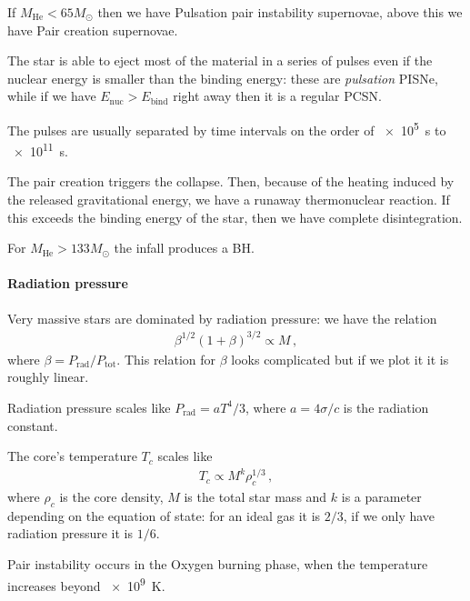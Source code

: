 \documentclass[main.tex]{subfiles}
\begin{document}
If \(M _{\text{He}} < 65 M_{\odot}\) then we have Pulsation pair instability supernovae, above this we have Pair creation supernovae. 

The star is able to eject most of the material in a series of pulses even if the nuclear energy is smaller than the binding energy: these are \emph{pulsation} PISNe, while if we have \(E _{\text{nuc}} > E _{\text{bind}}\) right away then it is a regular PCSN.

The pulses are usually separated by time intervals on the order of \SI{e5}{s} to \SI{e11}{s}.

The pair creation triggers the collapse. Then, because of the heating induced by the released gravitational energy, we have a runaway thermonuclear reaction. If this exceeds the binding energy of the star, then we have complete disintegration. 


For \(M _{\text{He}} > 133 M_{\odot}\) the infall produces a BH.


\paragraph{Radiation pressure}

Very massive stars are dominated by radiation pressure: 
we have the relation 
%
\begin{align}
\beta^{1/2} (1+\beta )^{3/2} \propto M 
\,,
\end{align}
%
where \(\beta = P _{\text{rad}} / P _{\text{tot}}\).
This relation for \(\beta \) looks complicated but if we plot it it is roughly linear.

Radiation pressure scales like \(P _{\text{rad}} = a T^{4}/3\), where \(a =4 \sigma / c \) is the radiation constant.

The core's temperature \(T_c\) scales like 
%
\begin{align}
T_c \propto M^{k} \rho_{c}^{1/3}
\,,
\end{align}
%
where \(\rho_{c}\) is the core density, \(M\) is the total star mass and \(k\) is a parameter depending on the equation of state: for an ideal gas it is \(2/3\), if we only have radiation pressure it is \(1/6\).

Pair instability occurs in the Oxygen burning phase, when the temperature increases beyond \SI{e9}{K}. 
\end{document}
